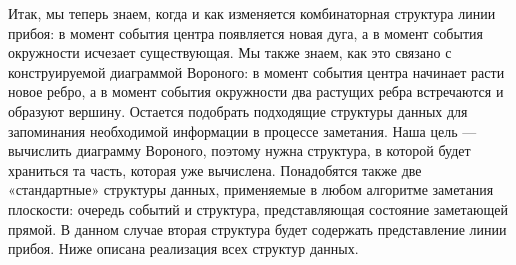 Итак,  мы  теперь  знаем,  когда  и  как  изменяется  комбинаторная  структура  линии  прибоя:  в  момент  события  центра  появляется  новая  дуга,  а  в  момент  события окружности  исчезает  существующая.
Мы  также  знаем,  как  это  связано  с  конструируемой  диаграммой  Вороного:  в  момент  события  центра  начинает  расти  новое ребро,  а  в  момент  события  окружности  два  растущих  ребра  встречаются  и  образуют  вершину.
Остается  подобрать  подходящие  структуры  данных  для  запоминания  необходимой  информации  в  процессе  заметания. 
Наша  цель  ---  вычислить диаграмму  Вороного,  поэтому  нужна  структура,  в  которой  будет  храниться  та часть,  которая  уже  вычислена.
Понадобятся  также  две  «стандартные»  структуры данных,  применяемые  в  любом  алгоритме  заметания  плоскости:  очередь  событий и  структура,  представляющая  состояние  заметающей  прямой.
В  данном  случае вторая  структура  будет  содержать  представление  линии  прибоя.
Ниже  описана 
реализация  всех  структур  данных.

